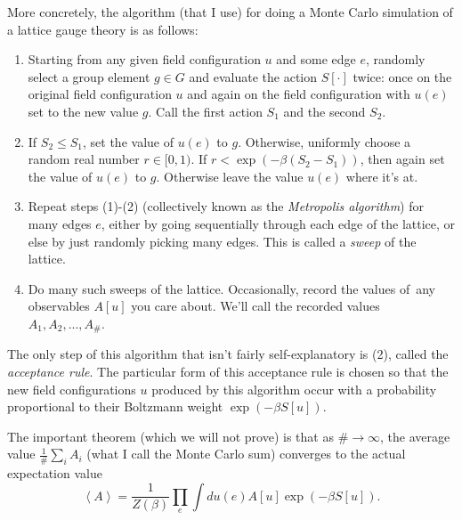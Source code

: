 \documentclass[9pt,twocolumn,twoside]{article}
\begin{document}
More concretely, the algorithm (that I use) for doing a Monte Carlo simulation of a lattice gauge theory is as follows:
\begin{enumerate}
\item Starting from any given field configuration $u$ and some edge $e$, randomly select a group element $g\in G$ and evaluate the action $S[\cdot]$ twice: once on the original field configuration $u$ and again on the field configuration with $u(e)$ set to the new value $g$.  Call the first action $S_1$ and the second $S_2$.
\item If $S_2\leq S_1$, set the value of $u(e)$ to $g$.  Otherwise, uniformly choose a random real number $r\in [0,1)$.  If $r<\exp\left(-\beta (S_2-S_1)\right)$, then again set the value of $u(e)$ to $g$.  Otherwise leave the value $u(e)$ where it's at.
\item Repeat steps (1)-(2) (collectively known as the \textit{Metropolis algorithm}) for many edges $e$, either by going sequentially through each edge of the lattice, or else by just randomly picking many edges.  This is called a \textit{sweep} of the lattice.
\item Do many such sweeps of the lattice.  Occasionally, record the values of\ any observables $A[u]$ you care about.  We'll call the recorded values $A_1,A_2,...,A_\#$.
\end{enumerate}

The only step of this algorithm that isn't fairly self-explanatory is (2), called the \textit{acceptance rule}.  The particular form of this acceptance rule is chosen so that the new field configurations $u$ produced by this algorithm occur with a probability proportional to their Boltzmann weight $\exp(-\beta S[u])$.

The important theorem (which we will not prove) is that as $\#\rightarrow \infty$, the average value $\frac{1}{\#} \sum_i A_i$ (what I call the Monte Carlo sum) converges to the actual expectation value
\[ \left<A\right> = \frac{1}{Z(\beta)}\prod_e \int du(e) A[u] \exp\left(-\beta S[u]\right).\]
\end{document}
